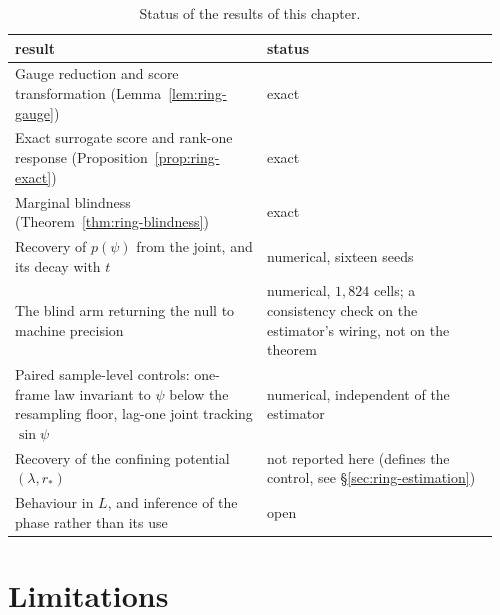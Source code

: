 \begin{table}[t]\centering
\caption[Status of the rotating-ring results]{Status of the results of this chapter.}
\label{tab:ring-claims}
\begin{tabular}{@{}p{0.50\linewidth}p{0.46\linewidth}@{}}
\toprule
result & status \\
\midrule
Gauge reduction and score transformation
  (Lemma~\ref{lem:ring-gauge}) & exact \\
Exact surrogate score and rank-one response
  (Proposition~\ref{prop:ring-exact}) & exact \\
Marginal blindness (Theorem~\ref{thm:ring-blindness}) & exact \\
Recovery of $p(\psi)$ from the joint, and its decay with $t$
  & numerical, sixteen seeds \\
The blind arm returning the null to machine precision
  & numerical, $1{,}824$ cells; a consistency check on the estimator's
    wiring, not on the theorem \\
Paired sample-level controls: one-frame law invariant to $\psi$ below the
  resampling floor, lag-one joint tracking $\sin\psi$
  & numerical, independent of the estimator \\
Recovery of the confining potential $(\lambda, r_*)$
  & not reported here (defines the control, see
    \S\ref{sec:ring-estimation}) \\
Behaviour in $L$, and inference of the phase rather than its use
  & open \\
\bottomrule
\end{tabular}
\end{table}

\section{Limitations}\label{sec:ring-limits}

